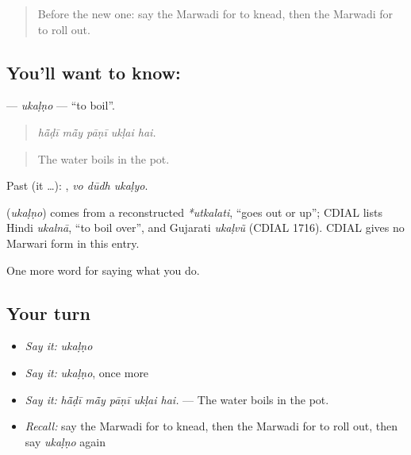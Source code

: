 \label{lesson:MW-C169-ukalno}



\begin{quote}
Before the new one: say the Marwadi for to knead, then the Marwadi for to roll out.
\end{quote}

\subsection*{You'll want to know: }
\textbf{} — \emph{ukaḷṇo} — \textquotedblleft{}to boil\textquotedblright{}.

\begin{quote}
    
\end{quote}

\begin{quote}
\emph{hā̃ḍī mā̃y pāṇī ukḷai hai.}
\end{quote}

\begin{quote}
The water boils in the pot.
\end{quote}

Past (it …):   , \emph{vo dūdh ukaḷyo}.

\begin{cousinweb}
\textbf{} (\emph{ukaḷṇo}) comes from a reconstructed \emph{*utkalati}, \textquotedblleft{}goes out or up\textquotedblright{}; CDIAL lists Hindi \emph{ukalnā}, \textquotedblleft{}to boil over\textquotedblright{}, and Gujarati \emph{ukaḷvũ} (CDIAL 1716). CDIAL gives no Marwari form in this entry.
\end{cousinweb}

\begin{grammarlens}[title={What you've built}]
One more word for saying what you do.
\end{grammarlens}

\subsection*{Your turn}
\begin{itemize}
\raggedright
  \item \emph{Say it:} \emph{ukaḷṇo}
  \item \emph{Say it:} \emph{ukaḷṇo}, once more
  \item \emph{Say it:} \emph{hā̃ḍī mā̃y pāṇī ukḷai hai.} — The water boils in the pot.
  \item \emph{Recall:} say the Marwadi for to knead, then the Marwadi for to roll out, then say \emph{ukaḷṇo} again
\end{itemize}

